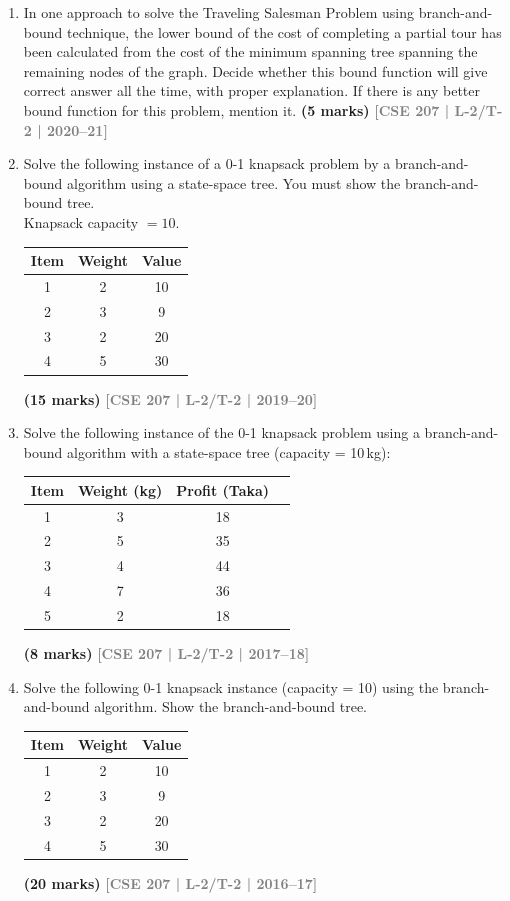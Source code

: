 \documentclass[12pt]{article}
\newcommand{\yr}[1]{\hfill\textcolor{gray}{\small\textbf{[#1]}}}
\newcommand{\mk}[1]{\textcolor{orange!70!black}{\small\textbf{(#1 marks)}}}
\begin{document}
\begin{enumerate}
Find the optimal tour using branch and bound, and pruning techniques combined.
\mk{20} \yr{CSE 207 | L-2/T-2 | 2021--22}


\item In one approach to solve the Traveling Salesman Problem using branch-and-bound technique, the lower bound of the cost of completing a partial tour has been calculated from the cost of the minimum spanning tree spanning the remaining nodes of the graph. Decide whether this bound function will give correct answer all the time, with proper explanation. If there is any better bound function for this problem, mention it.
\mk{5} \yr{CSE 207 | L-2/T-2 | 2020--21}


\item Solve the following instance of a 0-1 knapsack problem by a branch-and-bound algorithm using a state-space tree. You must show the branch-and-bound tree.\\[4pt]
Knapsack capacity $= 10$.
\begin{center}
\begin{tabular}{|c|c|c|}
\hline
\textbf{Item} & \textbf{Weight} & \textbf{Value} \\
\hline
1 & 2 & 10 \\
2 & 3 & 9  \\
3 & 2 & 20 \\
4 & 5 & 30 \\
\hline
\end{tabular}
\end{center}
\mk{15} \yr{CSE 207 | L-2/T-2 | 2019--20}


\item Solve the following instance of the 0-1 knapsack problem using a branch-and-bound algorithm with a state-space tree (capacity = 10\,kg):
\begin{center}
\begin{tabular}{cccc}
\toprule
Item & Weight (kg) & Profit (Taka) \\
\midrule
1 & 3 & 18 \\
2 & 5 & 35 \\
3 & 4 & 44 \\
4 & 7 & 36 \\
5 & 2 & 18 \\
\bottomrule
\end{tabular}
\end{center}
\mk{8}
\yr{CSE 207 | L-2/T-2 | 2017--18}


\item Solve the following 0-1 knapsack instance (capacity = 10) using the branch-and-bound algorithm. Show the branch-and-bound tree.
\begin{center}
\begin{tabular}{ccc}
\toprule
Item & Weight & Value \\
\midrule
1 & 2 & 10 \\
2 & 3 & 9 \\
3 & 2 & 20 \\
4 & 5 & 30 \\
\bottomrule
\end{tabular}
\end{center}
\mk{20}
\yr{CSE 207 | L-2/T-2 | 2016--17}



\end{enumerate}
\end{document}
